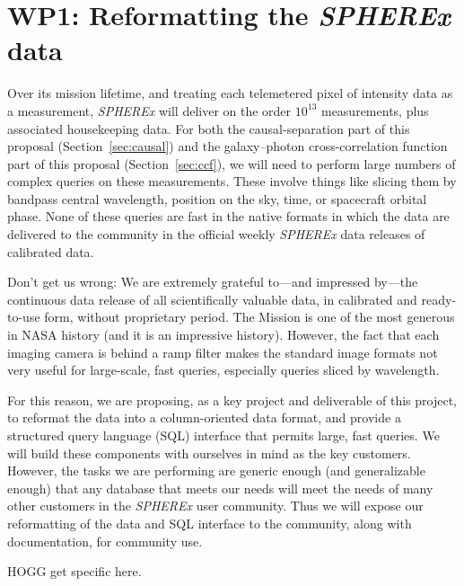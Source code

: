 \documentclass[12pt]{article}
\newcommand{\sectionname}{Section}
\newcommand{\secref}[1]{\sectionname~\ref{#1}}
\begin{document}
\section*{WP1: Reformatting the \textsl{SPHEREx} data}\label{sec:db}
Over its mission lifetime, and treating each telemetered pixel of intensity data as a measurement, \textsl{SPHEREx} will deliver on the order $10^{13}$ measurements, plus associated housekeeping data.
For both the causal-separation part of this proposal (\secref{sec:causal}) and the galaxy--photon cross-correlation function part of this proposal (\secref{sec:ccf}), we will need to perform large numbers of complex queries on these measurements.
These involve things like slicing them by bandpass central wavelength, position on the sky, time, or spacecraft orbital phase.
None of these queries are fast in the native formats in which the data are delivered to the community in the official weekly \textsl{SPHEREx} data releases of calibrated data.

Don't get us wrong: We are extremely grateful to---and impressed by---the continuous data release of all scientifically valuable data, in calibrated and ready-to-use form, without proprietary period.
The Mission is one of the most generous in NASA history (and it is an impressive history).
However, the fact that each imaging camera is behind a ramp filter makes the standard image formats not very useful for large-scale, fast queries, especially queries sliced by wavelength.

For this reason, we are proposing, as a key project and deliverable of this project, to reformat the data into a column-oriented data format, and provide a structured query language (SQL) interface that permits large, fast queries.
We will build these components with ourselves in mind as the key customers.
However, the tasks we are performing are generic enough (and generalizable enough) that any database that meets our needs will meet the needs of many other customers in the \textsl{SPHEREx} user community.
Thus we will expose our reformatting of the data and SQL interface to the community, along with documentation, for community use.

HOGG get specific here.

\end{document}
